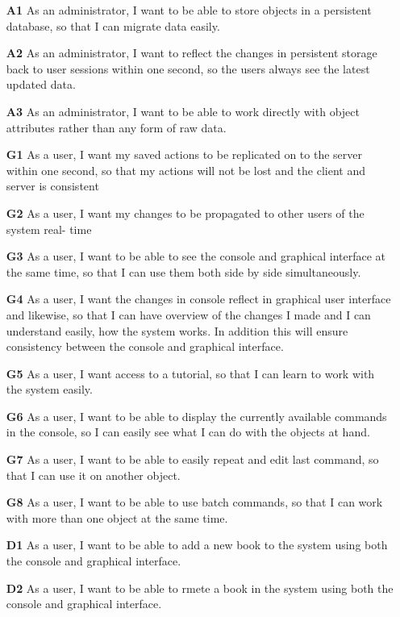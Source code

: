 \begin{itemize}
  \item [\textbf{A1}] As an administrator, I want to be able to store objects in a persistent database, so that I can migrate data easily.
  \item [\textbf{A2}] As an administrator, I want to reflect the changes in persistent storage back to user sessions within one second, so the users always see the latest updated data.
  \item [\textbf{A3}] As an administrator, I want to be able to work directly with object attributes rather than any form of raw data.
  \item [\textbf{G1}] As a user, I want my saved actions to be replicated on to the server within one second, so that my actions will not be lost and the client and server is consistent
  \item [\textbf{G2}] As a user, I want my changes to be propagated to other users of the system real- time
  \item [\textbf{G3}] As a user, I want to be able to see the console and graphical interface at the same time, so that I can use them both side by side simultaneously.
  \item [\textbf{G4}] As a user, I want the changes in console reflect in graphical user interface and likewise, so that I can have overview of the changes I made and I can understand easily, how the system works. In addition this will ensure consistency between the console and graphical interface.
  \item [\textbf{G5}] As a user, I want access to a tutorial, so that I can learn to work with the system easily.
  \item [\textbf{G6}] As a user, I want to be able to display the currently available commands in the console, so I can easily see what I can do with the objects at hand.
  \item [\textbf{G7}] As a user, I want to be able to easily repeat and edit last command, so that I can use it on another object.
  \item [\textbf{G8}] As a user, I want to be able to use batch commands, so that I can work with more than one object at the same time.
  \item [\textbf{D1}] As a user, I want to be able to add a new book to the system using both the console and graphical interface.
  \item [\textbf{D2}] As a user, I want to be able to rmete a book in the system using both the console and graphical interface.

\end{itemize}
